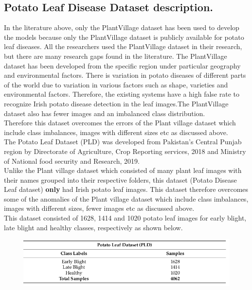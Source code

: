 \documentclass[11pt]{report}
\begin{document}
\subsection{Potato Leaf Disease Dataset description.}
In the literature above, only the PlantVillage dataset has been used to develop the models
because only the PlantVillage dataset is publicly available for potato leaf diseases. All the
researchers used the PlantVillage dataset in their research, but there are many research
gaps found in the literature. The PlantVillage dataset has been developed from the specific
region under particular geography and environmental factors. There is variation in potato
diseases of different parts of the world due to variation in various factors such as shape,
varieties and environmental factors. Therefore, the existing systems have a high false
rate to recognize Irish potato disease detection in the leaf images.The PlantVillage dataset also has fewer images and an imbalanced
class distribution.\\

Therefore this dataset overcomes the errors of the Plant village dataset which include class imbalances, images with different sizes etc as discussed above.\\

The Potato Leaf Dataset (PLD) was developed from Pakistan’s Central
Punjab region by Directorate of Agriculture, Crop Reporting services, 2018 and Ministry of National food security and Research, 2019.\\

Unlike the Plant village dataset which consisted of many plant leaf images with their names grouped into their respective folders, this dataset (Potato Disease Leaf dataset) \textbf{only} had Irish potato leaf images. This dataset therefore overcomes some of the anomalies of the Plant village dataset which include class imbalances, images with different sizes, fewer images etc as discussed above.\\

This dataset consisted of 1628, 1414 and 1020 potato
leaf images for early blight, late blight and healthy classes, respectively as shown below.\\


\begin{figure}[h]
	\centerline{\small 
		\includegraphics[height=0.11\textheight]  {hjk}}
\end{figure}
\end{document}
